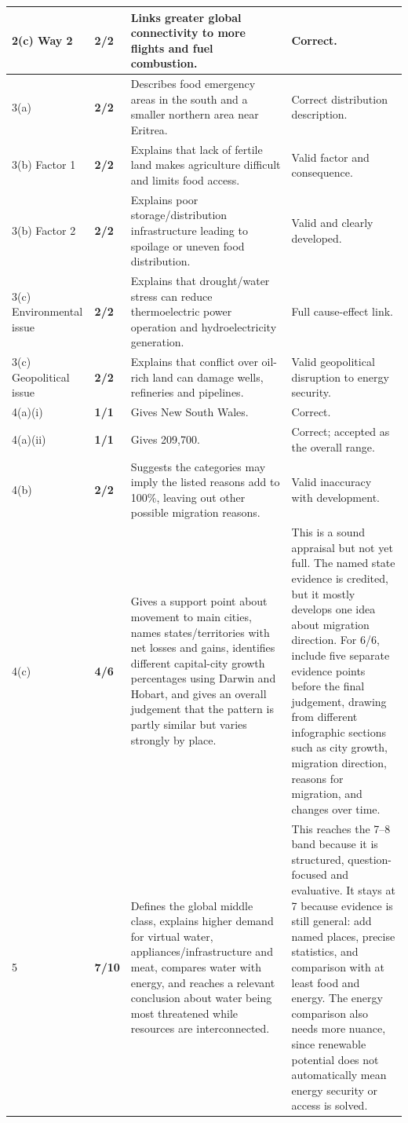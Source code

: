\documentclass[11pt]{article}
\newcommand{\markcell}[2]{\textbf{#1/#2}}
\begin{document}
\begin{longtable}{@{}p{} p{} p{} p{}@{}}
2(c) Way 2 & \markcell{2}{2} & Links greater global connectivity to more flights and fuel combustion. & Correct. \\
\midrule
3(a) & \markcell{2}{2} & Describes food emergency areas in the south and a smaller northern area near Eritrea. & Correct distribution description. \\
3(b) Factor 1 & \markcell{2}{2} & Explains that lack of fertile land makes agriculture difficult and limits food access. & Valid factor and consequence. \\
3(b) Factor 2 & \markcell{2}{2} & Explains poor storage/distribution infrastructure leading to spoilage or uneven food distribution. & Valid and clearly developed. \\
3(c) Environmental issue & \markcell{2}{2} & Explains that drought/water stress can reduce thermoelectric power operation and hydroelectricity generation. & Full cause-effect link. \\
3(c) Geopolitical issue & \markcell{2}{2} & Explains that conflict over oil-rich land can damage wells, refineries and pipelines. & Valid geopolitical disruption to energy security. \\
\midrule
4(a)(i) & \markcell{1}{1} & Gives New South Wales. & Correct. \\
4(a)(ii) & \markcell{1}{1} & Gives 209,700. & Correct; accepted as the overall range. \\
4(b) & \markcell{2}{2} & Suggests the categories may imply the listed reasons add to 100\%, leaving out other possible migration reasons. & Valid inaccuracy with development. \\
4(c) & \markcell{4}{6} & Gives a support point about movement to main cities, names states/territories with net losses and gains, identifies different capital-city growth percentages using Darwin and Hobart, and gives an overall judgement that the pattern is partly similar but varies strongly by place. & This is a sound appraisal but not yet full. The named state evidence is credited, but it mostly develops one idea about migration direction. For 6/6, include five separate evidence points before the final judgement, drawing from different infographic sections such as city growth, migration direction, reasons for migration, and changes over time. \\
\midrule
5 & \markcell{7}{10} & Defines the global middle class, explains higher demand for virtual water, appliances/infrastructure and meat, compares water with energy, and reaches a relevant conclusion about water being most threatened while resources are interconnected. & This reaches the 7--8 band because it is structured, question-focused and evaluative. It stays at 7 because evidence is still general: add named places, precise statistics, and comparison with at least food and energy. The energy comparison also needs more nuance, since renewable potential does not automatically mean energy security or access is solved. \\
\bottomrule
\end{longtable}
\end{document}
